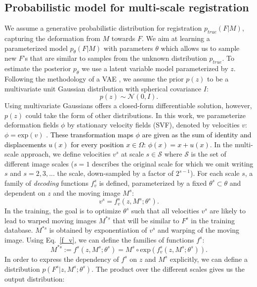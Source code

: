 \documentclass[journal]{IEEEtran}
\newcommand{\update}[1]{\textcolor{black}{#1}}
\begin{document}
\subsection{Probabilistic model for multi-scale registration}
We assume a generative probabilistic distribution for registration $p_{true}(F|M)$, capturing the deformation from $M$ towards $F$. We aim at learning a parameterized model $p_\theta(F|M)$ with parameters $\theta$ which allows us to sample new $F$'s that are similar to samples from the unknown distribution $p_{true}$. To estimate the posterior $p_\theta$ we use a latent variable model parameterized by $z$. Following the methodology of a VAE \cite{kingma2013auto}, we assume the prior $p(z)$ to be a multivariate unit Gaussian distribution with spherical covariance $I$:
\begin{equation}\label{p_z}
p(z) \sim \mathcal{N}(0, I).
\end{equation}
Using multivariate Gaussians offers a closed-form differentiable solution, however, $p(z)$ could take the form of other distributions. In this work, we parameterize deformation fields $\phi$ by stationary velocity fields (SVF), denoted by velocities $v$: $\phi=\text{exp}(v)$ \cite{arsigny2006log}. \update{These transformation maps $\phi$ are given as the sum of identity and displacements $u(x)$ for every position $x\in\Omega$: $\phi(x)=x+u(x)$}. In the multi-scale approach, we define velocities $v^s$ at scale $s\in \mathcal{S}$ where $\mathcal{S}$ is the set of different image scales ($s=1$ describes the original scale for which we omit writing $s$ and $s=2,3,...$ the scale, down-sampled by a factor of $2^{s-1}$). For each scale $s$, a family of \emph{decoding} functions $f_v^s$ is defined, parameterized by a fixed $\theta^s \subset \theta$ and dependent on $z$ and the moving image $M^s$: 
\begin{equation}\label{f_v}
v^s = f_v^s(z, M^s; \theta^s).
\end{equation}
In the training, the goal is to optimize $\theta^s$ such that all velocities $v^s$ are likely to lead to warped moving images $M^{*s}$ that will be similar to $F^s$ in the training database.  $M^{*s}$ is obtained by exponentiation of $v^s$ and warping of the moving image. Using Eq.\ \ref{f_v}, we can define the families of functions $f^s$: 
\begin{equation}\label{f_}
M^{*s} := f^s(z, M^s; \theta^s) = M^s\circ \text{exp}(f_v^s(z, M^s; \theta^s)).
\end{equation}
In order to express the dependency of $f^s$ on $z$ and $M^s$  explicitly, we can define a distribution $p(F^s | z,M^s;\theta^s)$. The product over the different scales gives us the output distribution: 
\end{document}
